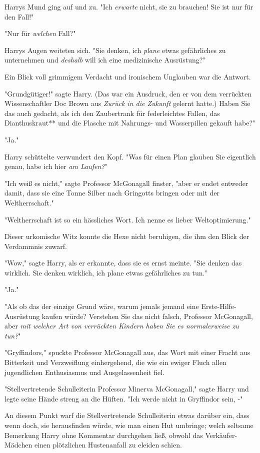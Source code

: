{Harrys Mund ging auf und zu. "Ich \emph{erwarte} nicht, sie zu brauchen! Sie ist nur für den Fall!"

"Nur für \emph{welchen} Fall?"

Harrys Augen weiteten sich. "Sie denken, ich \emph{plane} etwas gefährliches zu unternehmen und \emph{deshalb} will ich eine medizinische Ausrüstung?"

Ein Blick voll grimmigem Verdacht und ironischem Unglauben war die Antwort.

"Grundgütiger!" sagte Harry. (Das war ein Ausdruck, den er von dem verrückten Wissenschaftler Doc Brown aus \emph{Zurück in die Zukunft} gelernt hatte.) Haben Sie das auch gedacht, als ich den Zaubertrank für federleichtes Fallen, das Dianthuskraut** und die Flasche mit Nahrungs- und Wasserpillen gekauft habe?"

"Ja."

Harry schüttelte verwundert den Kopf. "Was für einen Plan glauben Sie eigentlich genau, habe ich hier \emph{am Laufen?}"

"Ich weiß es nicht," sagte Professor McGonagall finster, "aber er endet entweder damit, dass sie eine Tonne Silber nach Gringotts bringen oder mit der Weltherrschaft."

"Weltherrschaft ist so ein hässliches Wort. Ich nenne es lieber Weltoptimierung."

Dieser urkomische Witz konnte die Hexe nicht beruhigen, die ihm den Blick der Verdammnis zuwarf.

"Wow," sagte Harry, als er erkannte, dass sie es ernst meinte. "Sie denken das wirklich. Sie denken wirklich, ich plane etwas gefährliches zu tun."

"Ja."

"Als ob das der einzige Grund wäre, warum jemals jemand eine Erste-Hilfe-Ausrüstung kaufen würde? Verstehen Sie das nicht falsch, Professor McGonagall, aber \emph{mit welcher Art von verrückten Kindern haben Sie es normalerweise zu tun?}"

"Gryffindors," spuckte Professor McGonagall aus, das Wort mit einer Fracht aus Bitterkeit und Verzweiflung einhergehend, die wie ein ewiger Fluch allen jugendlichen Enthusiasmus und Ausgelassenheit fiel.

"Stellvertretende Schulleiterin Professor Minerva McGonagall," sagte Harry und legte seine Hände streng an die Hüften. "Ich werde nicht in Gryffindor sein, -"

An diesem Punkt warf die Stellvertretende Schulleiterin etwas darüber ein, dass wenn doch, sie herausfinden würde, wie man einen Hut umbringe; welch seltsame Bemerkung Harry ohne Kommentar durchgehen ließ, obwohl das Verkäufer-Mädchen einen plötzlichen Hustenanfall zu eleiden schien.

}
